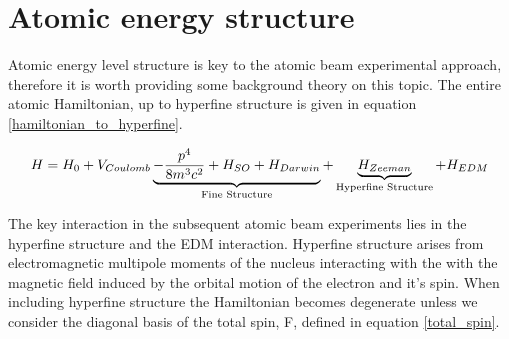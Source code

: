 \begin{table}[h]
    \centerline{
    }
    \caption{\label{tab:enhancement_factors} Enhancement factors of atoms and molecules previously used or proposed for electron EDM experiments. The molecular enhancement factors and effective electric fields are evaluated at an applied electric field of $E_{app} = 10 k\text{V} \text{cm}^{-1}$.}
\end{table}

\section{Atomic energy structure}
\label{atomic_energy_structure}

Atomic energy level structure is key to the atomic beam experimental approach, therefore it is worth providing some background theory on this topic. The entire atomic Hamiltonian, up to hyperfine structure is given in equation \eqref{hamiltonian_to_hyperfine}.

\begin{equation} \label{hamiltonian_to_hyperfine}
    H = H_{0} + V_{Coulomb} \underbrace{- \frac{p^4}{8m^3c^2} + H_{SO} + H_{Darwin}}_\textup{Fine Structure} + \underbrace{H_{Zeeman}}_\textup{Hyperfine Structure} + H_{EDM}
\end{equation}

The key interaction in the subsequent atomic beam experiments lies in the hyperfine structure and the EDM interaction. Hyperfine structure arises from electromagnetic multipole moments of the nucleus interacting with the with the magnetic field induced by the orbital motion of the electron and it's spin. When including hyperfine structure the Hamiltonian becomes degenerate unless we consider the diagonal basis of the total spin, F, defined in equation \eqref{total_spin}.

